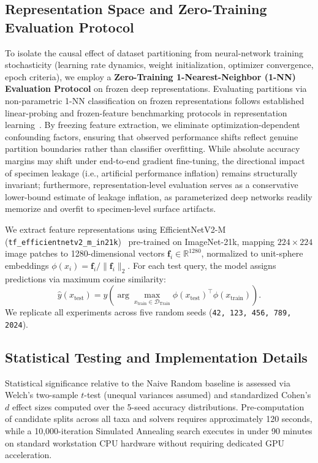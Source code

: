 \documentclass[a4paper,fleqn]{cas-sc}
\begin{document}
\subsection{Representation Space and Zero-Training Evaluation Protocol}
To isolate the causal effect of dataset partitioning from neural-network training stochasticity (learning rate dynamics, weight initialization, optimizer convergence, epoch criteria), we employ a \textbf{Zero-Training 1-Nearest-Neighbor (1-NN) Evaluation Protocol} on frozen deep representations. Evaluating partitions via non-parametric 1-NN classification on frozen representations follows established linear-probing and frozen-feature benchmarking protocols in representation learning~\cite{scikit}. By freezing feature extraction, we eliminate optimization-dependent confounding factors, ensuring that observed performance shifts reflect genuine partition boundaries rather than classifier overfitting. While absolute accuracy margins may shift under end-to-end gradient fine-tuning, the directional impact of specimen leakage (i.e., artificial performance inflation) remains structurally invariant; furthermore, representation-level evaluation serves as a conservative lower-bound estimate of leakage inflation, as parameterized deep networks readily memorize and overfit to specimen-level surface artifacts.

We extract feature representations using EfficientNetV2-M (\texttt{tf\_efficientnetv2\_m\_in21k})~\cite{efficientnetv2} pre-trained on ImageNet-21k, mapping $224\times224$ image patches to 1280-dimensional vectors $\boldsymbol{f}_i \in \mathbb{R}^{1280}$, normalized to unit-sphere embeddings $\phi(x_i) = \boldsymbol{f}_i / \|\boldsymbol{f}_i\|_2$. For each test query, the model assigns predictions via maximum cosine similarity:
\begin{equation}
\hat{y}(x_{\text{test}}) = y\left( \arg\max_{x_{\text{train}} \in \mathcal{D}_{\text{Train}}} \phi(x_{\text{test}})^{\!\top} \phi(x_{\text{train}}) \right).
\end{equation}
We replicate all experiments across five random seeds (\texttt{42, 123, 456, 789, 2024}).

\subsection{Statistical Testing and Implementation Details}
Statistical significance relative to the Naive Random baseline is assessed via Welch's two-sample $t$-test (unequal variances assumed) and standardized Cohen's $d$ effect sizes computed over the 5-seed accuracy distributions. Pre-computation of candidate splits across all taxa and solvers requires approximately 120 seconds, while a 10,000-iteration Simulated Annealing search executes in under 90 minutes on standard workstation CPU hardware without requiring dedicated GPU acceleration.
\end{document}
